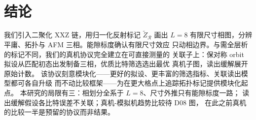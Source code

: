 \section{结论}
\label{sec:conclusion}

我们引入二聚化 XXZ 链，用归一化反射标记 $\tilde{Z}_{\mathcal R}$ 画出
$L=8$ 有限尺寸相图，分辨平庸、拓扑与 AFM 三相。能隙标度确认有限尺寸效应
只动相边界。与需全层析的标记不同，我们的真机协议完全建立在可直接测量的
关联子上：保对称 orbit 拟设从匹配初态出发制备三相，优质比特筛选选出最优
真机子图，读出缓解展开原始计数。
该协议刻意模块化——更好的拟设、更丰富的筛选指标、关联读出模型都可各自升级
而不动比较框架——为在更大格点上追踪拓扑标记提供模块化起点。
本研究的局限有三：相划分全系于 $L=8$、尺寸外推只有能隙标度一路；
读出缓解假设各比特误差不关联；真机-模拟机趋势比较待 D08 图，
在此之前真机的比较一半是预留的协议而非结果。
